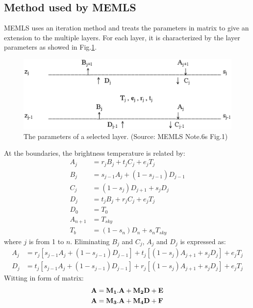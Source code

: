 \subsection{Method used by MEMLS}
\label{sec:mul_memls}
MEMLS uses an iteration method and treats the parameters in matrix to give an extension to the multiple layers. For each layer, it is characterized by the layer parameters as showed in Fig.\ref{fig:onelayer_memls}.
\begin{figure}[hbp]
  \centering
   \includegraphics[scale=0.5]{onelayer.eps} 
  \caption{The parameters of a selected layer. (Source: MEMLS Note.6s Fig.1)}
  \label{fig:onelayer_memls}
\end{figure}
At the boundaries, the brightness temperature is related by:
\begin{equation*}
\begin{split}
  A_j &= r_jB_j +t_jC_j+e_jT_j\\ 
  B_j &= s_{j-1}A_j +(1-s_{j-1})D_{j-1}\\ 
  C_j &= (1-s_j)D_{j+1}+s_jD_j\\ 
  D_j &= t_jB_j +r_jC_j+e_jT_j\\ 
  D_0 &= T_0\\
  A_{n+1} &= T_{sky}\\
  T_b &= (1-s_n)D_n+s_nT_{sky}
\end{split}
\end{equation*}
where $j$ is from 1 to $n$. Eliminating $B_j$ and $C_j$, $A_j$ and $D_j$ is expressed as:
\begin{equation*}
  \begin{split}
      A_j &= r_j[s_{j-1}A_j+(1-s_{j-1})D_{j-1}] +t_j[(1-s_j)A_{j+1}+s_jD_j]+e_jT_j\\
      D_j &= t_j[s_{j-1}A_j+(1-s_{j-1})D_{j-1}] +r_j[(1-s_j)A_{j+1}+s_jD_j]+e_jT_j
  \end{split}
\end{equation*}
Witting in form of matrix:
\begin{equation*}
\begin{split}
\bf{A}&=\bf{M_1}.\bf{A}+\bf{M_2}\bf{D}+\bf{E}\\  
\bf{A}&=\bf{M_3}.\bf{A}+\bf{M_4}\bf{D}+\bf{F}
\end{split}
\end{equation*}

